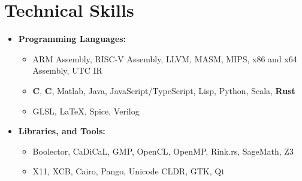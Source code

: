 \documentclass[10pt,letterpaper,sans]{moderncv}
\renewcommand{\_}{\textscale{.7}{\textunderscore}}
\newcommand{\Rplus}{\protect\hspace{-.1em}\protect\raisebox{.35ex}{\smaller{\smaller\textbf{+}}}}
\newcommand{\Cpp}{\mbox{C\Rplus\Rplus}\xspace}
\newcommand{\+}{%
  \raisebox{\dimexpr(\fontcharht\font`X-\height+\depth)/2\relax}{+}%
}
\begin{document}
\section{Technical Skills}
\begin{itemize}
\item \textbf{Programming Languages:}
  \begin{itemize}
  \item {} ARM Assembly, RISC-V Assembly, LLVM, MASM, MIPS, x86 and x64 Assembly, UTC IR
  \item {} \textbf{C}, \textbf{\Cpp}, Matlab, Java, JavaScript/TypeScript, Lisp, Python, Scala, \textbf{Rust}
  \item {} GLSL, \LaTeX, Spice, Verilog
  \end{itemize}
\item \textbf{Libraries, and Tools:} 
  \begin{itemize}
  \item {} Boolector, CaDiCaL, GMP, OpenCL, OpenMP, Rink.rs, SageMath, Z3
  \item {} X11, XCB, Cairo, Pango, Unicode CLDR, GTK, Qt
  \end{itemize}
\end{itemize}

\vspace*{-4cm}
\end{document}
